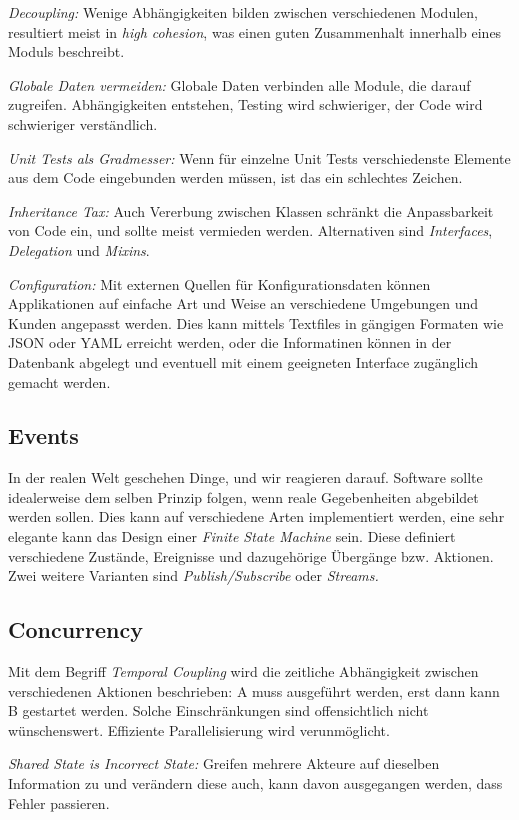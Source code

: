 \documentclass[10pt, oneside]{article}
\begin{document}
\emph{Decoupling: } Wenige Abhängigkeiten bilden zwischen verschiedenen Modulen, resultiert meist in \emph{high cohesion}, 
was einen guten Zusammenhalt innerhalb eines Moduls beschreibt.

\emph{Globale Daten vermeiden: } Globale Daten verbinden alle Module, die darauf zugreifen. 
Abhängigkeiten entstehen, Testing wird schwieriger, der Code wird schwieriger verständlich.

\emph{Unit Tests als Gradmesser: } Wenn für einzelne Unit Tests verschiedenste Elemente aus dem Code eingebunden werden müssen, 
ist das ein schlechtes Zeichen. 

\emph{Inheritance Tax: } Auch Vererbung zwischen Klassen schränkt die Anpassbarkeit von Code ein, und sollte meist vermieden werden. 
Alternativen sind \emph{Interfaces}, \emph{Delegation} und \emph{Mixins}.

\emph{Configuration: } Mit externen Quellen für Konfigurationsdaten können Applikationen auf einfache Art und Weise an verschiedene Umgebungen und Kunden angepasst werden.
Dies kann mittels Textfiles in gängigen Formaten wie JSON oder YAML erreicht werden, oder die Informatinen können in der Datenbank abgelegt und eventuell mit 
einem geeigneten Interface zugänglich gemacht werden.

\subsection{Events}
In der realen Welt geschehen Dinge, und wir reagieren darauf. Software sollte idealerweise dem selben Prinzip folgen, wenn reale Gegebenheiten abgebildet werden sollen. 
Dies kann auf verschiedene Arten implementiert werden, eine sehr elegante kann das Design einer \emph{Finite State Machine} sein. 
Diese definiert verschiedene Zustände, Ereignisse und dazugehörige Übergänge bzw. Aktionen. Zwei weitere Varianten sind \emph{Publish/Subscribe} oder \emph{Streams.} 

\subsection{Concurrency}
Mit dem Begriff \emph{Temporal Coupling} wird die zeitliche Abhängigkeit zwischen verschiedenen Aktionen beschrieben: A muss ausgeführt werden, erst dann kann B gestartet werden.
Solche Einschränkungen sind offensichtlich nicht wünschenswert. Effiziente Parallelisierung wird verunmöglicht.

\emph{Shared State is Incorrect State: } Greifen mehrere Akteure auf dieselben Information zu und verändern diese auch, kann davon ausgegangen werden, dass Fehler passieren. 
\end{document}

